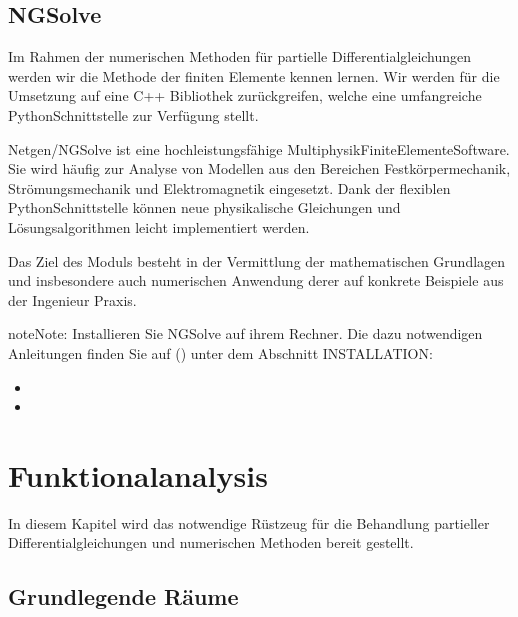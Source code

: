 \documentclass[letterpaper,10pt,english]{jupyterBook}
\begin{document}
\chapter{NGSolve}
\label{\detokenize{Software/NGSolve:ngsolve}}\label{\detokenize{Software/NGSolve::doc}}
Im Rahmen der numerischen Methoden für partielle Differentialgleichungen werden wir die Methode der finiten Elemente kennen lernen. Wir werden für die Umsetzung auf eine C++ Bibliothek  zurückgreifen, welche eine umfangreiche Python\sphinxhyphen{}Schnittstelle zur Verfügung stellt.

Netgen/NGSolve ist eine hochleistungsfähige Multiphysik\sphinxhyphen{}Finite\sphinxhyphen{}Elemente\sphinxhyphen{}Software. Sie wird häufig zur Analyse von Modellen aus den Bereichen Festkörpermechanik, Strömungsmechanik und Elektromagnetik eingesetzt. Dank der flexiblen Python\sphinxhyphen{}Schnittstelle können neue physikalische Gleichungen und Lösungsalgorithmen leicht implementiert werden.

Das Ziel des Moduls besteht in der Vermittlung der mathematischen Grundlagen und insbesondere auch numerischen Anwendung derer auf konkrete Beispiele aus der Ingenieur Praxis.

\begin{sphinxadmonition}{note}{Note:}
Installieren Sie NGSolve auf ihrem Rechner. Die dazu notwendigen Anleitungen finden Sie auf () unter dem Abschnitt INSTALLATION:
\begin{itemize}
\item {} 

\item {} 

\end{itemize}
\end{sphinxadmonition}


\part{Funktionalanalysis}

In diesem Kapitel wird das notwendige Rüstzeug für die Behandlung partieller Differentialgleichungen und numerischen Methoden bereit gestellt.


\chapter{Grundlegende Räume}
\label{\detokenize{Funktionalanalysis/GrundlegendeRaeume:grundlegende-raume}}\label{\detokenize{Funktionalanalysis/GrundlegendeRaeume::doc}}
\end{document}
